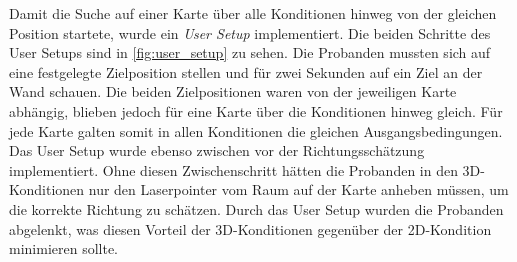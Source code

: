 Damit die Suche auf einer Karte über alle Konditionen hinweg von der gleichen Position startete, wurde ein \emph{User Setup} implementiert.
Die beiden Schritte des User Setups sind in \autoref{fig:user_setup} zu sehen.
Die Probanden mussten sich auf eine festgelegte Zielposition stellen und für zwei Sekunden auf ein Ziel an der Wand schauen.
Die beiden Zielpositionen waren von der jeweiligen Karte abhängig, blieben jedoch für eine Karte über die Konditionen hinweg gleich.
Für jede Karte galten somit in allen Konditionen die gleichen Ausgangsbedingungen.
Das User Setup wurde ebenso zwischen vor der Richtungsschätzung implementiert.
Ohne diesen Zwischenschritt hätten die Probanden in den 3D-Konditionen nur den Laserpointer vom Raum auf der Karte anheben müssen, um die korrekte Richtung zu schätzen.
Durch das User Setup wurden die Probanden abgelenkt, was diesen Vorteil der 3D-Konditionen gegenüber der 2D-Kondition minimieren sollte.
